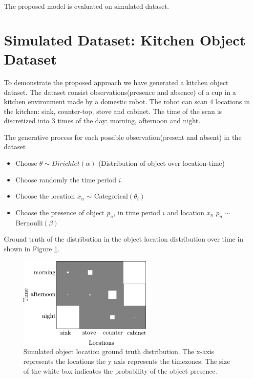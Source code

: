 The proposed model is  evaluated on simulated dataset. 


\section{Simulated Dataset: Kitchen Object Dataset}

To demonstrate the proposed approach we have generated a kitchen object dataset. The dataset consist observations(presence and absence) of a cup in a kitchen environment made by a domestic robot. The robot can scan 4 locations in the kitchen: sink, counter-top, stove and cabinet. The time of the scan is discretized into 3 times of the day: morning, afternoon and night. 

The generative process for each possible observation(present and absent) in the dataset 
\begin{itemize}
    \item Choose $ \theta \sim Dirichlet(\alpha)$ (Distribution of object over location-time)
    \item Choose randomly the time period $i$.
	\item Choose the location $x_n$ $\sim$ Categorical$(\theta_i)$
	\item Choose the presence of object $p_n$, in time period $i$ and location $x_n$  $p_n$ $\sim$ Bernoulli$(\beta) $
\end{itemize}

Ground truth of the distribution in the object location distribution over time in shown in Figure \ref{absent-gt}.


\begin{figure}[htp]
\centering
\includegraphics[width=0.6\textwidth]{images/absent_groundtruth.png}
\caption[Simulated object location ground truth distribution]{Simulated object location ground truth distribution.
The x-axis represents the locations the y axis represents the timezones. The size of the white box indicates the probability of the object presence.}
\label{absent-gt}
\end{figure}


